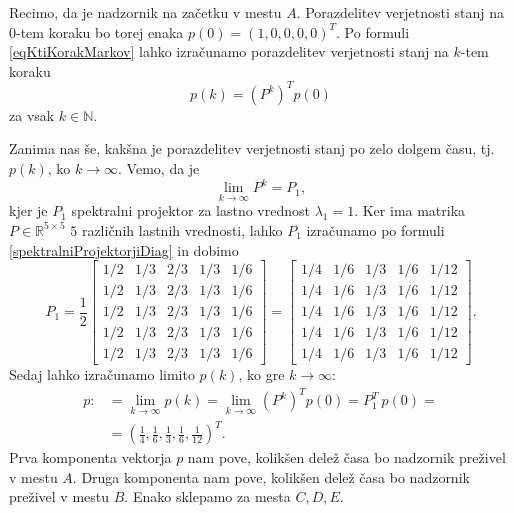 \documentclass[mat1]{fmfdelo}
\newcommand{\R}{\mathbb R}
\newcommand{\N}{\mathbb N}
\begin{document}
Recimo, da je nadzornik na začetku v mestu $A$. Porazdelitev verjetnosti stanj na $0$-tem koraku bo torej enaka $p(0) = (1, 0, 0, 0, 0)^T$. Po formuli \eqref{eqKtiKorakMarkov} lahko izračunamo porazdelitev verjetnosti stanj na $k$-tem koraku
\begin{equation*}
    p(k) = \left(P^k\right)^T p(0)
\end{equation*}
za vsak $k\in\N$.

Zanima nas še, kakšna je porazdelitev verjetnosti stanj po zelo dolgem času, tj.\ $p(k)$, ko $k\rightarrow\infty$. Vemo, da je
\begin{equation*}
    \lim_{k\rightarrow\infty} P^k = P_1,
\end{equation*}
kjer je $P_1$ spektralni projektor za lastno vrednost $\lambda_1 = 1$. Ker ima matrika $P \in \R^{5 \times 5}$ $5$ različnih lastnih vrednosti, lahko $P_1$ izračunamo po formuli \eqref{spektralniProjektorjiDiag} in dobimo
\begin{equation*}
    P_1 = \frac{1}{2}
    \begin{bmatrix}
        1/2 & 1/3 & 2/3 & 1/3 & 1/6 \\
        1/2 & 1/3 & 2/3 & 1/3 & 1/6 \\
        1/2 & 1/3 & 2/3 & 1/3 & 1/6 \\
        1/2 & 1/3 & 2/3 & 1/3 & 1/6 \\
        1/2 & 1/3 & 2/3 & 1/3 & 1/6
    \end{bmatrix}
    =
    \begin{bmatrix}
        1/4 & 1/6 & 1/3 & 1/6 & 1/12 \\
        1/4 & 1/6 & 1/3 & 1/6 & 1/12 \\
        1/4 & 1/6 & 1/3 & 1/6 & 1/12 \\
        1/4 & 1/6 & 1/3 & 1/6 & 1/12 \\
        1/4 & 1/6 & 1/3 & 1/6 & 1/12
    \end{bmatrix}.
\end{equation*}
Sedaj lahko izračunamo limito $p(k)$, ko gre $k\rightarrow\infty$:
\begin{align*}
    p :&=\lim_{k\rightarrow\infty} p(k) = \lim_{k\rightarrow\infty} \left(P^k\right)^T p(0) = P_1^T\  p(0) = \\
    &= \left(\frac{1}{4}, \frac{1}{6}, \frac{1}{3}, \frac{1}{6}, \frac{1}{12}\right)^T.
\end{align*}
Prva komponenta vektorja $p$ nam pove, kolikšen delež časa bo nadzornik preživel v mestu $A$. Druga komponenta nam pove, kolikšen delež časa bo nadzornik preživel v mestu $B$. Enako sklepamo za mesta $C, D, E$.
\end{document}
